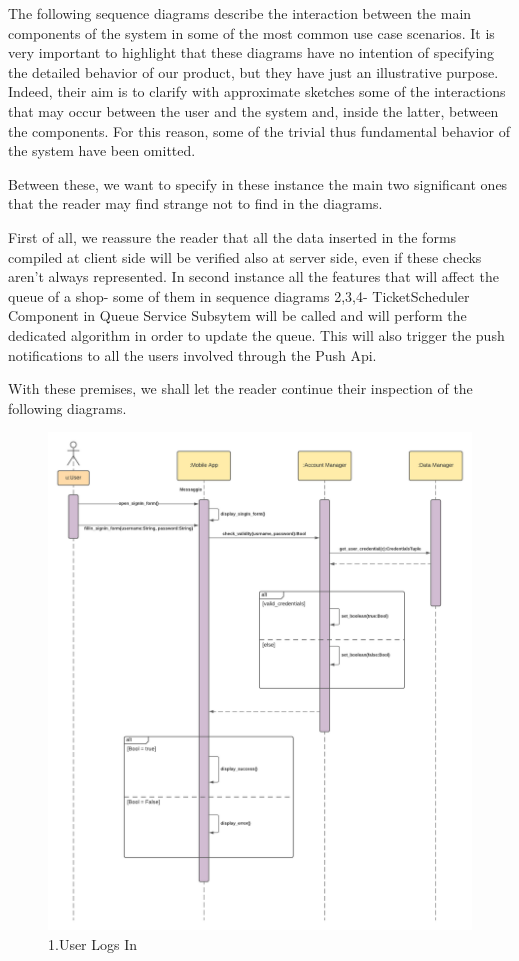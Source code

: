 The following sequence diagrams describe the interaction between the main components of the system in some of the most common use case scenarios. It is very important to highlight that these diagrams have no intention of specifying the detailed behavior of our product, but they have just an illustrative purpose. Indeed, their aim is to clarify with approximate sketches some of the interactions that may occur between the user and the system and, inside the latter, between the components.
For this reason, some of the trivial thus fundamental behavior of the system have been omitted. 

Between these, we want to specify in these instance the main two significant ones that the reader may find strange not to find in the diagrams.

First of all, we reassure the reader that all the data inserted in the forms compiled at client side will be verified also at server side, even if these checks aren't always represented.\newline
In second instance all the features that will affect the queue of a shop- some of them in sequence diagrams 2,3,4- TicketScheduler Component in Queue Service Subsytem will be called and will perform the dedicated algorithm in order to update the queue. This will also trigger the push notifications to all the users involved through the Push Api.

With these premises, we shall let the reader continue their inspection of the following diagrams.

\begin{figure}[h!]
    \centering
    \includegraphics[width=1\textwidth]{Images/runtimeViewDD/RunTimeViewUserLogIn(1).png}
    \caption{\label{fig:RunTimeViewUserLogsIn}{1.User Logs In}}
\end{figure}

